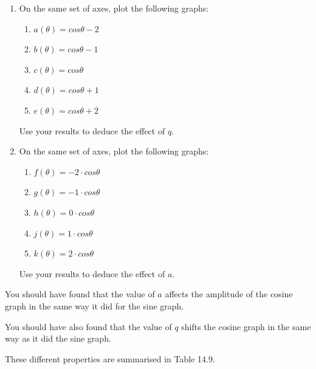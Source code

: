         \label{m39414*id87553}\begin{enumerate}[noitemsep, label=\textbf{\arabic*}. ] 
            \label{m39414*uid53}\item On the same set of axes, plot the following graphs:
\label{m39414*id87568}\begin{enumerate}[noitemsep, label=\textbf{\alph*}. ] 
            \label{m39414*uid54}\item $a\left(\theta \right)=cos\theta -2$\label{m39414*uid55}\item $b\left(\theta \right)=cos\theta -1$\label{m39414*uid56}\item $c\left(\theta \right)=cos\theta $\label{m39414*uid57}\item $d\left(\theta \right)=cos\theta +1$\label{m39414*uid58}\item $e\left(\theta \right)=cos\theta +2$\end{enumerate}
Use your results to deduce the effect of $q$.
\label{m39414*uid59}\item On the same set of axes, plot the following graphs:
\label{m39414*id87790}\begin{enumerate}[noitemsep, label=\textbf{\alph*}. ] 
            \label{m39414*uid60}\item $f\left(\theta \right)=-2\ensuremath{\cdot}cos\theta $\label{m39414*uid61}\item $g\left(\theta \right)=-1\ensuremath{\cdot}cos\theta $\label{m39414*uid62}\item $h\left(\theta \right)=0\ensuremath{\cdot}cos\theta $\label{m39414*uid63}\item $j\left(\theta \right)=1\ensuremath{\cdot}cos\theta $\label{m39414*uid64}\item $k\left(\theta \right)=2\ensuremath{\cdot}cos\theta $\end{enumerate}
Use your results to deduce the effect of $a$.
\end{enumerate}
        \label{m39414*id88024}You should have found that the value of $a$ affects the amplitude of the cosine graph in the same way it did for the sine graph.\par 
        \label{m39414*id88038}You should have also found that the value of $q$ shifts the cosine graph in the same way as it did the sine graph.\par 


        \label{m39414*id88050}These different properties are summarised in Table 14.9.\par 

